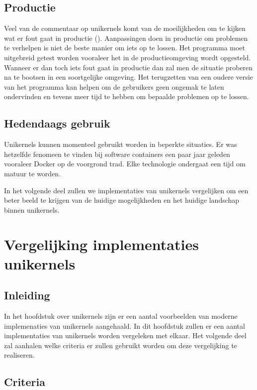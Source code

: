 \documentclass[pdftex,a4paper,12pt,twoside]{report}
\begin{document}
\section{Productie}

Veel van de commentaar op unikernels komt van de moeilijkheden om te kijken wat er fout gaat in productie (\cite{bryan_cantrill_unikernels_2016}). Aanpassingen doen in productie om problemen te verhelpen is niet de beste manier om iets op te lossen. Het programma moet uitgebreid getest worden vooraleer het in de productieomgeving wordt opgesteld. Wanneer er dan toch iets fout gaat in productie dan zal men de situatie proberen na te bootsen in een soortgelijke omgeving. Het terugzetten van een oudere versie van het programma kan helpen om de gebruikers geen ongemak te laten ondervinden en tevens meer tijd te hebben om bepaalde problemen op te lossen.

\section{Hedendaags gebruik}

Unikernels kunnen momenteel gebruikt worden in beperkte situaties. Er was hetzelfde fenomeen te vinden bij software containers een paar jaar geleden vooraleer Docker op de voorgrond trad. Elke technologie ondergaat een tijd om matuur te worden.

In het volgende deel zullen we implementaties van unikernels vergelijken om een beter beeld te krijgen van de huidige mogelijkheden en het huidige landschap binnen unikernels.

\chapter{Vergelijking implementaties unikernels}

\section{Inleiding}

In het hoofdstuk over unikernels zijn er een aantal voorbeelden van moderne implemenaties van unikernels aangehaald. In dit hoofdstuk zullen er een aantal implementaties van unikernels worden vergeleken met elkaar. Het volgende deel zal aanhalen welke criteria er zullen gebruikt worden om deze vergelijking te realiseren.

\section{Criteria}
\end{document}
